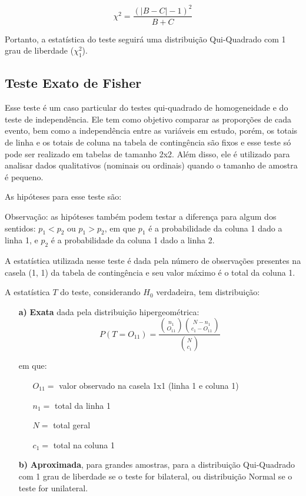 \documentclass[
]{estat/estat}
\begin{document}
\[ \chi^{2} = \frac{(|B - C| - 1)^{2}}{B + C} \]

Portanto, a estatística do teste seguirá uma distribuição Qui-Quadrado
com 1 grau de liberdade (\(\chi_{1}^{2}\)).

\hypertarget{teste-exato-de-fisher}{%
\subsection{Teste Exato de Fisher}\label{teste-exato-de-fisher}}

Esse teste é um caso particular do testes qui-quadrado de homogeneidade
e do teste de independência. Ele tem como objetivo comparar as
proporções de cada evento, bem como a independência entre as variáveis
em estudo, porém, os totais de linha e os totais de coluna na tabela de
contingência são fixos e esse teste só pode ser realizado em tabelas de
tamanho 2x2. Além disso, ele é utilizado para analisar dados
qualitativos (nominais ou ordinais) quando o tamanho de amostra é
pequeno.

As hipóteses para esse teste são:


Observação: as hipóteses também podem testar a diferença para algum dos
sentidos: \(p_{1} < p_{2}\) ou \(p_{1} > p_{2}\), em que \(p_{1}\) é a
probabilidade da coluna 1 dado a linha 1, e \(p_{2}\) é a probabilidade
da coluna 1 dado a linha 2.

A estatística utilizada nesse teste é dada pela número de observações
presentes na casela (1, 1) da tabela de contingência e seu valor máximo
é o total da coluna 1.

A estatística \(T\) do teste, considerando \(H_{0}\) verdadeira, tem
distribuição:

\begin{itemize}
    \item [\bf a)] \textbf{Exata} dada pela distribuição hipergeométrica:
    $$ P(T = O_{11}) = \frac{\binom{n_{1}}{O_{11}} \binom{N - n_{1}}{c_{1} - O_{11}}}{\binom{N}{c_{1}}} $$
    
    em que:
    \begin{itemize}
        \item [] $O_{11} =$ valor observado na casela 1x1 (linha 1 e coluna 1)
        \item [] $n_{1} =$ total da linha 1
        \item [] $N =$ total geral
        \item [] $c_{1} =$ total na coluna 1
    \end{itemize}
    
    \item [\bf b)] \textbf{Aproximada}, para grandes amostras, para a distribuição Qui-Quadrado com 1 grau de liberdade se o teste for bilateral, ou distribuição Normal se o teste for unilateral.
\end{itemize}
\end{document}
